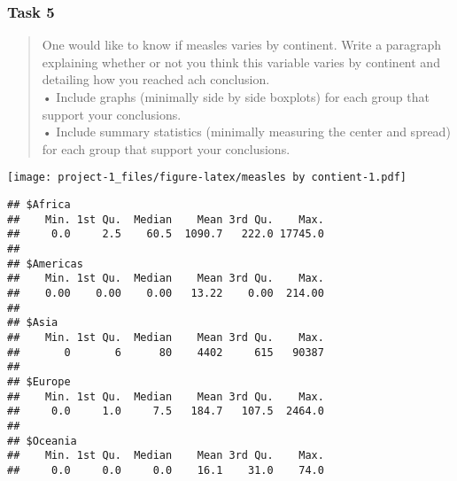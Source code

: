\documentclass[
]{article}
\newenvironment{Shaded}{\begin{snugshade}}{\end{snugshade}}
\newcommand{\AttributeTok}[1]{\textcolor[rgb]{0.77,0.63,0.00}{#1}}
\newcommand{\DecValTok}[1]{\textcolor[rgb]{0.00,0.00,0.81}{#1}}
\newcommand{\FunctionTok}[1]{\textcolor[rgb]{0.00,0.00,0.00}{#1}}
\newcommand{\NormalTok}[1]{#1}
\newcommand{\SpecialCharTok}[1]{\textcolor[rgb]{0.00,0.00,0.00}{#1}}
\newcommand{\StringTok}[1]{\textcolor[rgb]{0.31,0.60,0.02}{#1}}
\begin{document}
\hypertarget{task-5}{%
\subsubsection{Task 5}\label{task-5}}

\begin{quote}
One would like to know if measles varies by continent. Write a paragraph
explaining whether or not you think this variable varies by continent
and detailing how you reached ach conclusion.\\
• Include graphs (minimally side by side boxplots) for each group that
support your conclusions.\\
• Include summary statistics (minimally measuring the center and spread)
for each group that support your conclusions.
\end{quote}

\begin{Shaded}
\end{Shaded}

\texttt{[image: project-1\_files/figure-latex/measles by contient-1.pdf]}

\begin{Shaded}
\end{Shaded}

\begin{verbatim}
## $Africa
##    Min. 1st Qu.  Median    Mean 3rd Qu.    Max. 
##     0.0     2.5    60.5  1090.7   222.0 17745.0 
## 
## $Americas
##    Min. 1st Qu.  Median    Mean 3rd Qu.    Max. 
##    0.00    0.00    0.00   13.22    0.00  214.00 
## 
## $Asia
##    Min. 1st Qu.  Median    Mean 3rd Qu.    Max. 
##       0       6      80    4402     615   90387 
## 
## $Europe
##    Min. 1st Qu.  Median    Mean 3rd Qu.    Max. 
##     0.0     1.0     7.5   184.7   107.5  2464.0 
## 
## $Oceania
##    Min. 1st Qu.  Median    Mean 3rd Qu.    Max. 
##     0.0     0.0     0.0    16.1    31.0    74.0
\end{verbatim}
\end{document}
